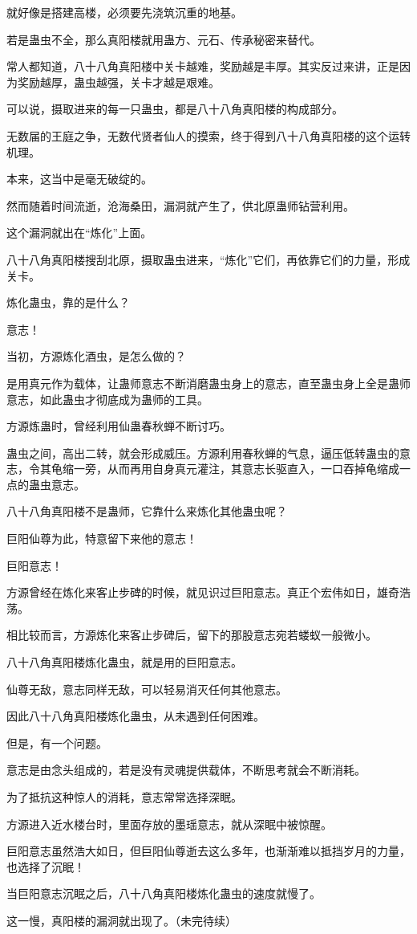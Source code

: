 \begin{this_body}
就好像是搭建高楼，必须要先浇筑沉重的地基。

若是蛊虫不全，那么真阳楼就用蛊方、元石、传承秘密来替代。

常人都知道，八十八角真阳楼中关卡越难，奖励越是丰厚。其实反过来讲，正是因为奖励越厚，蛊虫越强，关卡才越是艰难。

可以说，摄取进来的每一只蛊虫，都是八十八角真阳楼的构成部分。

无数届的王庭之争，无数代贤者仙人的摸索，终于得到八十八角真阳楼的这个运转机理。

本来，这当中是毫无破绽的。

然而随着时间流逝，沧海桑田，漏洞就产生了，供北原蛊师钻营利用。

这个漏洞就出在“炼化”上面。

八十八角真阳楼搜刮北原，摄取蛊虫进来，“炼化”它们，再依靠它们的力量，形成关卡。

炼化蛊虫，靠的是什么？

意志！

当初，方源炼化酒虫，是怎么做的？

是用真元作为载体，让蛊师意志不断消磨蛊虫身上的意志，直至蛊虫身上全是蛊师意志，如此蛊虫才彻底成为蛊师的工具。

方源炼蛊时，曾经利用仙蛊春秋蝉不断讨巧。

蛊虫之间，高出二转，就会形成威压。方源利用春秋蝉的气息，逼压低转蛊虫的意志，令其龟缩一旁，从而再用自身真元灌注，其意志长驱直入，一口吞掉龟缩成一点的蛊虫意志。

八十八角真阳楼不是蛊师，它靠什么来炼化其他蛊虫呢？

巨阳仙尊为此，特意留下来他的意志！

巨阳意志！

方源曾经在炼化来客止步碑的时候，就见识过巨阳意志。真正个宏伟如日，雄奇浩荡。

相比较而言，方源炼化来客止步碑后，留下的那股意志宛若蝼蚁一般微小。

八十八角真阳楼炼化蛊虫，就是用的巨阳意志。

仙尊无敌，意志同样无敌，可以轻易消灭任何其他意志。

因此八十八角真阳楼炼化蛊虫，从未遇到任何困难。

但是，有一个问题。

意志是由念头组成的，若是没有灵魂提供载体，不断思考就会不断消耗。

为了抵抗这种惊人的消耗，意志常常选择深眠。

方源进入近水楼台时，里面存放的墨瑶意志，就从深眠中被惊醒。

巨阳意志虽然浩大如日，但巨阳仙尊逝去这么多年，也渐渐难以抵挡岁月的力量，也选择了沉眠！

当巨阳意志沉眠之后，八十八角真阳楼炼化蛊虫的速度就慢了。

这一慢，真阳楼的漏洞就出现了。（未完待续）

\end{this_body}

